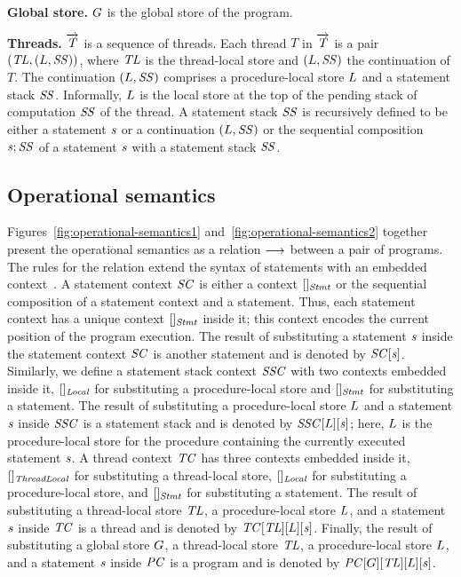 \noindent
{\bf Global store.}
$G$ is the global store of the program.

\noindent
{\bf Threads.}
$\overrightarrow{\mathit{T}}$ is a sequence of threads.
Each thread $T$ in $\overrightarrow{\mathit{T}}$ is a pair $(\mathit{TL}, (L, \mathit{SS}))$, where $\mathit{TL}$ is the thread-local 
store and $(L, \mathit{SS})$ the continuation of $T$.  
The continuation $(L, \mathit{SS})$ comprises a procedure-local store $L$ and a statement stack $\mathit{SS}$.
Informally, $L$ is the local store at the top of the pending stack of computation $\mathit{SS}$ of the thread.
A statement stack $\mathit{SS}$ is recursively defined to be either a statement $\mathit{s}$ 
or a continuation $(L,\mathit{SS})$ or the sequential composition $\mathit{s};\mathit{SS}$ of a statement $\mathit{s}$ with 
a statement stack $\mathit{SS}$.

\subsection{Operational semantics}
\label{sec:operational-semantics}

Figures~\ref{fig:operational-semantics1} and~\ref{fig:operational-semantics2} together present the operational semantics as a relation 
$\longrightarrow$ between a pair of programs.
The rules for the relation extend the syntax of statements with an embedded context~\cite{WrightF94}.
A statement context $\mathit{SC}$ is either a context $[]_{\mathit{Stmt}}$ or the sequential composition of a 
statement context and a statement.
Thus, each statement context has a unique context $[]_{\mathit{Stmt}}$ inside it;
this context encodes the current position of the program execution.
The result of substituting a statement $\mathit{s}$ inside the statement context $\mathit{SC}$ is another statement and is denoted by $\mathit{SC}[\mathit{s}]$.
Similarly, we define a statement stack context $\mathit{SSC}$ with two contexts embedded inside it, $[]_{\mathit{Local}}$ for substituting a procedure-local store
and $[]_{\mathit{Stmt}}$ for substituting a statement.
The result of substituting a procedure-local store $L$ and a statement $\mathit{s}$ inside 
$\mathit{SSC}$ is a statement stack and is denoted by $\mathit{SSC}[L][\mathit{s}]$;
here, $L$ is the procedure-local store for the procedure containing the currently executed statement $\mathit{s}$.
A thread context $\mathit{TC}$ has three contexts embedded inside it, $[]_{\mathit{ThreadLocal}}$ for substituting a thread-local store, 
$[]_{\mathit{Local}}$ for substituting a procedure-local store, and $[]_{\mathit{Stmt}}$ for substituting a statement.
The result of substituting a thread-local store $\mathit{TL}$, a procedure-local store $L$, and a statement $\mathit{s}$ inside $\mathit{TC}$ 
is a thread and is denoted by $\mathit{TC}[\mathit{TL}][L][\mathit{s}]$.
Finally, the result of substituting a global store $G$, a thread-local store $\mathit{TL}$, a procedure-local store $L$, and a statement $\mathit{s}$ inside $\mathit{PC}$ is a program and is denoted by $\mathit{PC}[G][\mathit{TL}][L][\mathit{s}]$.

